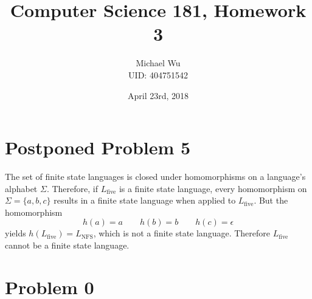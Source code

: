 \documentclass[12pt]{article}
\begin{document}
\title{Computer Science 181, Homework 3}
\date{April 23rd, 2018}
\author{Michael Wu\\UID: 404751542}
\maketitle

\section*{Postponed Problem 5}

The set of finite state languages is closed under homomorphisms on a language's alphabet \(\Sigma\). Therefore, if \(L_\text{five}\) is a
finite state language, every homomorphism on \(\Sigma=\{a, b, c\}\) results in a finite state language when applied
to \(L_\text{five}\). But the homomorphism
\[h(a)=a \qquad h(b)=b \qquad h(c)=\epsilon\]
yields \(h(L_\text{five})=L_\text{NFS}\), which is not a finite state language. Therefore \(L_\text{five}\) cannot be a finite
state language.

\section*{Problem 0}
\end{document}
